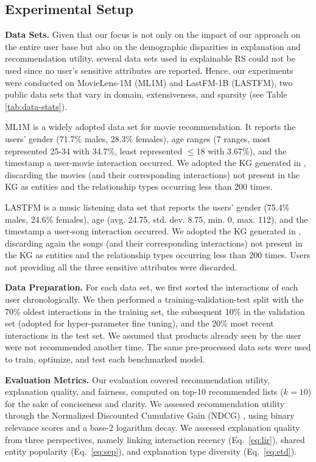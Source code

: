 \documentclass[sigconf]{acmart}
\begin{document}
\subsection{Experimental Setup}

\vspace{1mm}\noindent\textbf{Data Sets.} 
Given that our focus is not only on the impact of our approach on the entire user base but also on the demographic disparities in explanation and recommendation utility, several data sets used in explainable RS could not be used since no user's sensitive attributes are reported.
Hence, our experiments were conducted on MovieLens-1M (ML1M) and LastFM-1B (LASTFM), two public data sets that vary in domain, extensiveness, and sparsity (see Table \ref{tab:data-stats}). 

ML1M is a widely adopted data set for movie recommendation. It reports the users' gender (71.7\% males, 28.3\%  females), age ranges (7 ranges, most represented 25-34 with 34.7\%, least represented $\leq 18$ with 3.67\%), and the timestamp a user-movie interaction occurred. 
We adopted the KG generated in \cite{CaoWHHC19}, discarding the movies (and their corresponding interactions) not present in the KG as entities and the relationship types occurring less than 200 times.   

LASTFM is a music listening data set that reports the users' gender (75.4\% males, 24.6\% females), age (avg. 24.75, std. dev. 8.75, min. 0, max. 112), and the timestamp a user-song interaction occurred. 
We adopted the KG generated in \cite{Wang00LC19}, discarding again the songs (and their corresponding interactions) not present in the KG as entities and the relationship types occurring less than 200 times. 
Users not providing all the three sensitive attributes were discarded.  

\vspace{1mm}\noindent\textbf{Data Preparation.} 
For each data set, we first sorted the interactions of each user chronologically. 
We then performed a training-validation-test split with the 70\% oldest interactions in the training set, the subsequent 10\% in the validation set (adopted for hyper-parameter fine tuning), and the 20\% most recent interactions in the test set. 
We assumed that products already seen by the user were not recommended another time. 
The same pre-processed data sets were used to train, optimize, and test each benchmarked model.

\vspace{1mm}\noindent\textbf{Evaluation Metrics.} 
Our evaluation covered recommendation utility, explanation quality, and fairness, computed on top-10 recommended lists ($k=10$) for the sake of conciseness and clarity. 
We assessed recommendation utility through the Normalized Discounted Cumulative Gain (NDCG) \cite{WangWLHL13}, using binary relevance scores and a base-2 logarithm decay.
We assessed explanation quality from three perspectives, namely linking interaction recency (Eq.~\eqref{eq:lir}), shared entity popularity (Eq.~\eqref{eq:sep}), and explanation type diversity (Eq.~\eqref{eq:etd}). 
\end{document}
